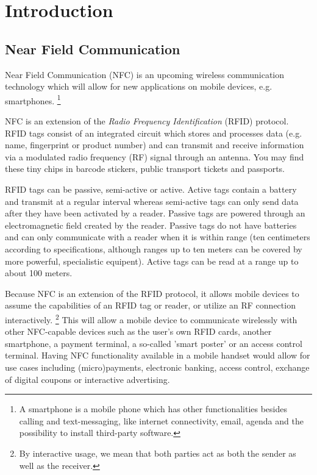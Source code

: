 \section{Introduction}


\subsection{Near Field Communication} %
Near Field Communication (NFC) is an upcoming wireless communication technology which will allow for new applications on mobile devices, e.g. smartphones. \footnote{A smartphone is a mobile phone which has other functionalities besides calling and text-messaging, like internet connectivity, email, agenda and the possibility to install third-party software.}

NFC is an extension of the \textit{Radio Frequency Identification} (RFID) protocol.
RFID tags consist of an integrated circuit which stores and processes data (e.g. name, fingerprint or product number) and can transmit and receive information via a modulated radio frequency (RF) signal through an antenna.
You may find these tiny chips in barcode stickers, public transport tickets and passports.

RFID tags can be passive, semi-active or active.
Active tags contain a battery and transmit at a regular interval whereas semi-active tags can only send data after they have been activated by a reader.
Passive tags are powered through an electromagnetic field created by the reader.
Passive tags do not have batteries and can only communicate with a reader when it is within range (ten centimeters according to specifications, although ranges up to ten meters can be covered by more powerful, specialistic equipent).
Active tags can be read at a range up to about 100 meters.
 
Because NFC is an extension of the RFID protocol, it allows mobile devices to assume the capabilities of an RFID tag or reader, or utilize an RF connection interactively. \footnote{By interactive usage, we mean that both parties act as both the sender as well as the receiver.}
This will allow a mobile device to communicate wirelessly with other NFC-capable devices such as the user's own RFID cards, another smartphone, a payment terminal, a so-called 'smart poster' or an access control terminal.
Having NFC functionality available in a mobile handset would allow for use cases including (micro)payments, electronic banking, access control, exchange of digital coupons or interactive advertising.

